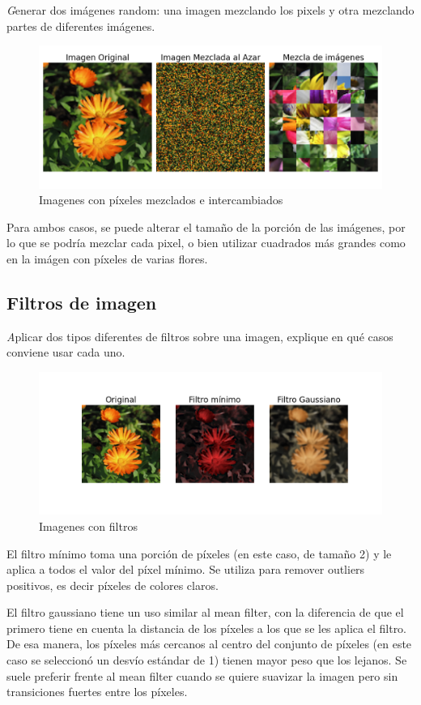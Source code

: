 \documentclass{article}
\begin{document}
{\emph Generar dos imágenes random: una imagen mezclando los pixels y otra mezclando
partes de diferentes imágenes.}

\begin{figure}[h!]
  \centering    
  \includegraphics[width=.75\textwidth]{5_mezcla.png}
  \caption{Imagenes con píxeles mezclados e intercambiados}
\end{figure}

Para ambos casos, se puede alterar el tamaño de la porción de las imágenes, por lo que se podría mezclar cada pixel, o bien utilizar cuadrados más grandes como en la imágen con píxeles de varias flores.

\subsection{Filtros de imagen}

{\emph Aplicar dos tipos diferentes de filtros sobre una imagen, 
explique en qué casos conviene usar cada uno.}
\begin{figure}[h!]
  \centering    
  \includegraphics[width=1\textwidth]{6_filtro.png}
  \caption{Imagenes con filtros}
\end{figure}

El filtro mínimo toma una porción de píxeles (en este caso, de tamaño 2) y 
le aplica a todos el valor del píxel mínimo. Se utiliza para remover 
outliers positivos, es decir píxeles de colores claros.

El filtro gaussiano tiene un uso similar al mean filter, con la
diferencia de que el primero tiene en cuenta la distancia de los 
píxeles a los que se les aplica el filtro. De esa manera, los píxeles
más cercanos al centro del conjunto de píxeles (en este caso se seleccionó un
desvío estándar de 1) tienen mayor peso que los lejanos. Se suele preferir
frente al mean filter cuando se quiere suavizar la imagen pero sin transiciones
fuertes entre los píxeles.
\end{document}
